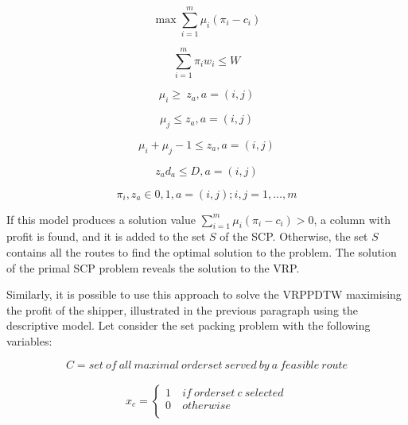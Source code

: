 \begin{equation}
    \max{\sum_{i=1}^{m}{\mu_i(\pi_i-c_i)}}
\end{equation}

\begin{equation}
    \sum_{i=1}^{m}{\pi_iw_i\le W}
\end{equation}

\begin{equation}
    \mu_i\geq\ z_a , a=(i,j)
\end{equation}

\begin{equation}
    \mu_j\le z_a , a=(i,j)
\end{equation}

\begin{equation}
    \mu_i+\mu_j-1\le z_a , a=(i,j)
\end{equation}

\begin{equation}
    z_ad_a\le D , a=(i,j)
\end{equation}

\begin{equation}
    \pi_i,z_a\in{0,1} , a=\left(i,j\right);i,j=1,\ldots,m
\end{equation}

If this model produces a solution value $\sum_{i=1}^{m}{\mu_i(\pi_i-c_i)}>0$, a column with profit is found, and it is added to the set $S$ of the SCP. Otherwise, the set $S$ contains all the routes to find the optimal solution to the problem. The solution of the primal SCP problem reveals the solution to the VRP. \par

Similarly, it is possible to use this approach to solve the VRPPDTW maximising the profit of the shipper, illustrated in the previous paragraph using the descriptive model. Let consider the set packing problem with the following variables:

\begin{equation}
    C=set\ of\ all\ maximal\ orderset\ served\ by\ a\ feasible\ route
\end{equation}

\begin{equation}
   \begin{split}
   x_c=\left\{
                \begin{array}{ll}
                  1\ & if\ orderset\ c\ selected\\
                  0 & otherwise\\
                \end{array}
              \right.
   \end{split}
\end{equation}

